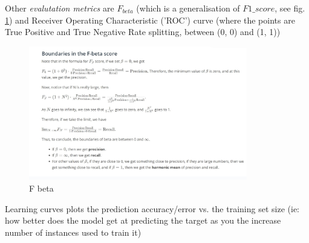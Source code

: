 \documentclass[11pt]{article}
\begin{document}
Other \textit{evalutation metrics} are $F_{beta}$ (which is a generalisation of  $F1\_score$, see fig. \ref{F_beta_boundaries}) and Receiver Operating Characteristic ('ROC') curve (where the points are True Positive and True Negative Rate splitting, between (0, 0) and (1, 1))
\begin{figure}[htbp] 
	\centering
	\includegraphics[width=0.85\textwidth]{pics/F_beta_boundaries}
	\caption{F beta}  
	\label{F_beta_boundaries}
\end{figure}

Learning curves plots the prediction accuracy/error vs. the training set size (ie: how better does the model get at predicting the target as you the increase number of instances used to train it)
\end{document}
